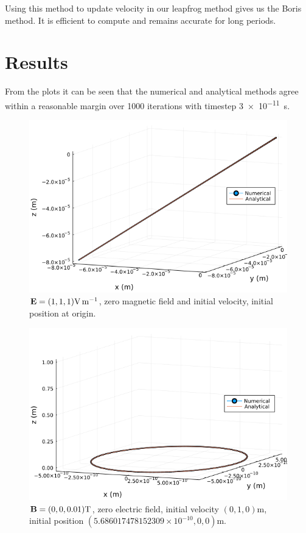\documentclass[twoside]{article}
\begin{document}
Using this method to update velocity in our leapfrog method gives us the Boris method. It is efficient to compute and remains accurate for long periods.

\section{Results}
From the plots it can be seen that the numerical and analytical methods agree within a reasonable margin over 1000 iterations with timestep \SI{3e-11}{\second}.

\begin{figure}
  \centering
  \includegraphics[width=\textwidth]{Econst_B0.png}
  \caption{$\vb{E}=(1,1,1)\si{\volt\per\metre}$, zero magnetic field and initial velocity, initial position at origin.}
  \label{fig: E const B 0}
\end{figure}
\begin{figure}
  \centering
  \includegraphics[width=\textwidth]{E0_Bconst.png}
  \caption{$\vb{B}=(0,0,0.01)\si{\tesla}$, zero electric  field, initial velocity $(0, 1, 0)\si{\metre}$, initial position $(5.686017478152309\times10^{-10}, 0, 0)\si{\metre}$.}
  \label{fig: E 0 B const}
\end{figure}
\end{document}
